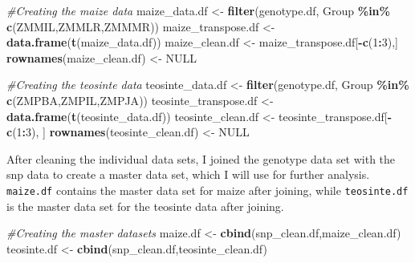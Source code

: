 \documentclass[
]{article}
\newenvironment{Shaded}{\begin{snugshade}}{\end{snugshade}}
\newcommand{\AttributeTok}[1]{\textcolor[rgb]{0.13,0.29,0.53}{#1}}
\newcommand{\CommentTok}[1]{\textcolor[rgb]{0.56,0.35,0.01}{\textit{#1}}}
\newcommand{\ConstantTok}[1]{\textcolor[rgb]{0.56,0.35,0.01}{#1}}
\newcommand{\DecValTok}[1]{\textcolor[rgb]{0.00,0.00,0.81}{#1}}
\newcommand{\FunctionTok}[1]{\textcolor[rgb]{0.13,0.29,0.53}{\textbf{#1}}}
\newcommand{\NormalTok}[1]{#1}
\newcommand{\OtherTok}[1]{\textcolor[rgb]{0.56,0.35,0.01}{#1}}
\newcommand{\SpecialCharTok}[1]{\textcolor[rgb]{0.81,0.36,0.00}{\textbf{#1}}}
\newcommand{\StringTok}[1]{\textcolor[rgb]{0.31,0.60,0.02}{#1}}
\begin{document}
\begin{Shaded}
\begin{Highlighting}[]
\CommentTok{\#Creating the maize data}
\NormalTok{maize\_data.df }\OtherTok{\textless{}{-}} \FunctionTok{filter}\NormalTok{(genotype.df, }\StringTok{\textasciigrave{}}\AttributeTok{Group}\StringTok{\textasciigrave{}} \SpecialCharTok{\%in\%} \FunctionTok{c}\NormalTok{(}\StringTok{\textquotesingle{}ZMMIL\textquotesingle{}}\NormalTok{,}\StringTok{\textquotesingle{}ZMMLR\textquotesingle{}}\NormalTok{,}\StringTok{\textquotesingle{}ZMMMR\textquotesingle{}}\NormalTok{))}
\NormalTok{maize\_transpose.df }\OtherTok{\textless{}{-}} \FunctionTok{data.frame}\NormalTok{(}\FunctionTok{t}\NormalTok{(maize\_data.df))}
\NormalTok{maize\_clean.df }\OtherTok{\textless{}{-}}\NormalTok{ maize\_transpose.df[}\SpecialCharTok{{-}}\FunctionTok{c}\NormalTok{(}\DecValTok{1}\SpecialCharTok{:}\DecValTok{3}\NormalTok{),]}
\FunctionTok{rownames}\NormalTok{(maize\_clean.df) }\OtherTok{\textless{}{-}} \ConstantTok{NULL}

\CommentTok{\#Creating the teosinte data}
\NormalTok{teosinte\_data.df }\OtherTok{\textless{}{-}} \FunctionTok{filter}\NormalTok{(genotype.df, }\StringTok{\textasciigrave{}}\AttributeTok{Group}\StringTok{\textasciigrave{}} \SpecialCharTok{\%in\%} \FunctionTok{c}\NormalTok{(}\StringTok{\textquotesingle{}ZMPBA\textquotesingle{}}\NormalTok{,}\StringTok{\textquotesingle{}ZMPIL\textquotesingle{}}\NormalTok{,}\StringTok{\textquotesingle{}ZMPJA\textquotesingle{}}\NormalTok{))}
\NormalTok{teosinte\_transpose.df }\OtherTok{\textless{}{-}} \FunctionTok{data.frame}\NormalTok{(}\FunctionTok{t}\NormalTok{(teosinte\_data.df))}
\NormalTok{teosinte\_clean.df }\OtherTok{\textless{}{-}}\NormalTok{ teosinte\_transpose.df[}\SpecialCharTok{{-}}\FunctionTok{c}\NormalTok{(}\DecValTok{1}\SpecialCharTok{:}\DecValTok{3}\NormalTok{), ]}
\FunctionTok{rownames}\NormalTok{(teosinte\_clean.df) }\OtherTok{\textless{}{-}} \ConstantTok{NULL}
\end{Highlighting}
\end{Shaded}

After cleaning the individual data sets, I joined the genotype data set
with the snp data to create a master data set, which I will use for
further analysis. \texttt{maize.df} contains the master data set for
maize after joining, while \texttt{teosinte.df} is the master data set
for the teosinte data after joining.

\begin{Shaded}
\begin{Highlighting}[]
\CommentTok{\#Creating the master datasets}
\NormalTok{maize.df }\OtherTok{\textless{}{-}} \FunctionTok{cbind}\NormalTok{(snp\_clean.df,maize\_clean.df)}
\NormalTok{teosinte.df }\OtherTok{\textless{}{-}} \FunctionTok{cbind}\NormalTok{(snp\_clean.df,teosinte\_clean.df)}
\end{Highlighting}
\end{Shaded}
\end{document}
